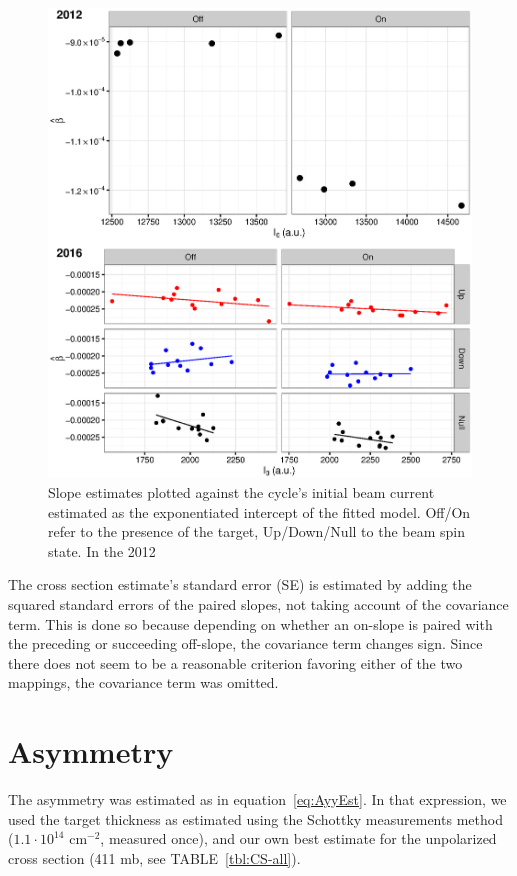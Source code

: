 \documentclass[reprint, superscriptaddress]{revtex4-1}
\newcommand{\scl}{.4}
\begin{document}
\begin{figure}
\centering
\includegraphics[scale=\scl]{img/Slope_VS_Current.eps}
\caption{Slope estimates plotted against the cycle's initial beam current estimated as the exponentiated intercept of the fitted model. Off/On refer to the presence of the target, Up/Down/Null to the beam spin state. In the 2012 \label{fig:SlpOnI0}}
\end{figure}

The cross section estimate's standard error (SE) is estimated by adding the squared standard errors of the paired slopes, not taking account of the covariance term. This is done so because depending on whether an on-slope is paired with the preceding or succeeding off-slope, the covariance term changes sign. Since there does not seem to be a reasonable criterion favoring either of the two mappings, the covariance term was omitted.

\section{Asymmetry}

The asymmetry was estimated as in equation~\eqref{eq:AyyEst}. In that expression, we used the target thickness as estimated using the Schottky measurements method~\cite{Stein} ($1.1\cdot 10^{14}$ cm$^{-2}$, measured once), and our own best estimate for the unpolarized cross section (411 mb, see TABLE~\ref{tbl:CS-all}).\\
\end{document}
